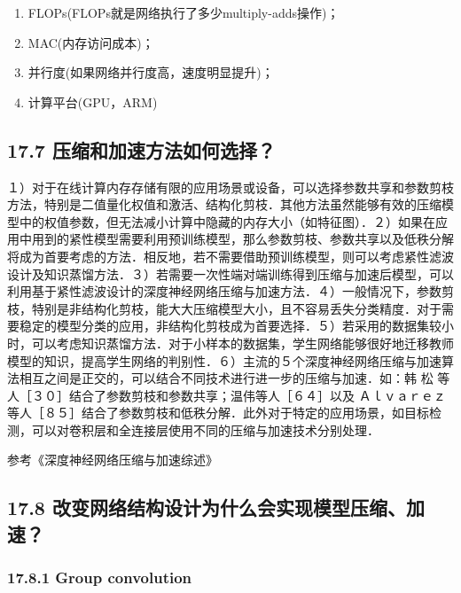 \begin{enumerate}
\def\labelenumi{\arabic{enumi}.}
\item
  FLOPs(FLOPs就是网络执行了多少multiply-adds操作)；
\item
  MAC(内存访问成本)；
\item
  并行度(如果网络并行度高，速度明显提升)；
\item
  计算平台(GPU，ARM)
\end{enumerate}

\subsection{17.7
压缩和加速方法如何选择？}\label{ux538bux7f29ux548cux52a0ux901fux65b9ux6cd5ux5982ux4f55ux9009ux62e9}

​
１）对于在线计算内存存储有限的应用场景或设备，可以选择参数共享和参数剪枝方法，特别是二值量化权值和激活、结构化剪枝．其他方法虽然能够有效的压缩模型中的权值参数，但无法减小计算中隐藏的内存大小（如特征图）．
​
２）如果在应用中用到的紧性模型需要利用预训练模型，那么参数剪枝、参数共享以及低秩分解将成为首要考虑的方法．相反地，若不需要借助预训练模型，则可以考虑紧性滤波设计及知识蒸馏方法．
​
３）若需要一次性端对端训练得到压缩与加速后模型，可以利用基于紧性滤波设计的深度神经网络压缩与加速方法．
​
４）一般情况下，参数剪枝，特别是非结构化剪枝，能大大压缩模型大小，且不容易丢失分类精度．对于需要稳定的模型分类的应用，非结构化剪枝成为首要选择．
​
５）若采用的数据集较小时，可以考虑知识蒸馏方法．对于小样本的数据集，学生网络能够很好地迁移教师模型的知识，提高学生网络的判别性．
​
６）主流的５个深度神经网络压缩与加速算法相互之间是正交的，可以结合不同技术进行进一步的压缩与加速．如：韩
松 等 人［３０］结合了参数剪枝和参数共享；温伟等人［６４］以及
Ａｌｖａｒｅｚ等人［８５］结合了参数剪枝和低秩分解．此外对于特定的应用场景，如目标检测，可以对卷积层和全连接层使用不同的压缩与加速技术分别处理．

参考《深度神经网络压缩与加速综述》

\subsection{17.8
改变网络结构设计为什么会实现模型压缩、加速？}\label{ux6539ux53d8ux7f51ux7edcux7ed3ux6784ux8bbeux8ba1ux4e3aux4ec0ux4e48ux4f1aux5b9eux73b0ux6a21ux578bux538bux7f29ux52a0ux901f}

\subsubsection{17.8.1 Group convolution}\label{group-convolution}

